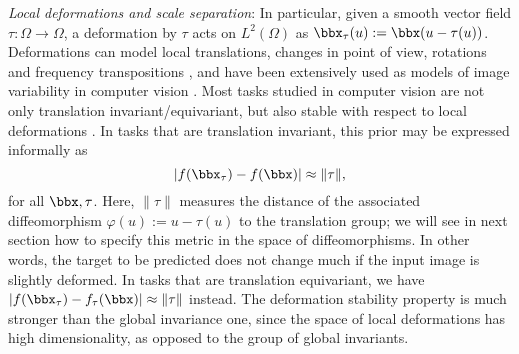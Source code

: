 {{\em Local deformations and scale separation}:} 
In particular, given a smooth vector field $\tau: \Omega \to \Omega$, a deformation by $\tau$ acts on $L^2(\Omega)$ as 
$\bbx_\tau(u) := \bbx(u -\tau(u))$. Deformations can model local translations, changes in point of view, rotations and
frequency transpositions \cite{bruna2013invariant}, and have 
been extensively used as models of image variability in computer vision 
\cite{jain1996object, felzenszwalb2010object, girshick2014rich}.
Most tasks studied in computer vision are not only translation invariant/equivariant, but also stable with respect to local deformations \cite{mallat2016understanding,bruna2013invariant}. In tasks that are translation invariant, this prior may be expressed informally as 
\begin{equation}
\label{deformstab}
| f( \bbx_\tau) - f( \bbx) | \approx \| \tau \|,
\end{equation}
for all $\bbx, \tau$. 
 Here, $\| \tau \| $ measures the distance 
 of the associated diffeomorphism $\varphi(u):= u - \tau(u)$ to the translation group; we will see in next section how to specify this metric in the space of diffeomorphisms. In other words, 
 the target to be predicted does not change much if the input image is slightly deformed. 
%
In tasks that are translation equivariant, we have $| f( \bbx_\tau ) -  f_\tau( \bbx) | \approx \|  \tau \| $
 instead.
The deformation stability property is much stronger than the global invariance one, since the space of local deformations has high dimensionality, 
as opposed to the group of global invariants. 

